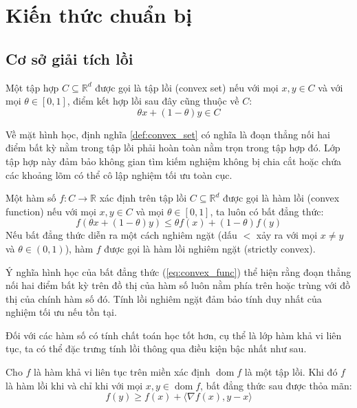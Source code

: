 \chapter{Kiến thức chuẩn bị}

\section{Cơ sở giải tích lồi}

\begin{definition}
\label{def:convex_set}
Một tập hợp $C \subseteq \mathbb{R}^d$ được gọi là tập lồi (convex set) nếu với mọi $x, y \in C$ và với mọi $\theta \in [0, 1]$, điểm kết hợp lồi sau đây cũng thuộc về $C$:
\begin{equation}
\theta x + (1 - \theta)y \in C
\end{equation}
\end{definition}

Về mặt hình học, định nghĩa \ref{def:convex_set} có nghĩa là đoạn thẳng nối hai điểm bất kỳ nằm trong tập lồi phải hoàn toàn nằm trọn trong tập hợp đó. Lớp tập hợp này đảm bảo không gian tìm kiếm nghiệm không bị chia cắt hoặc chứa các khoảng lõm có thể cô lập nghiệm tối ưu toàn cục.

\begin{definition}
\label{def:convex_function}
Một hàm số $f: C \to \mathbb{R}$ xác định trên tập lồi $C \subseteq \mathbb{R}^d$ được gọi là hàm lồi (convex function) nếu với mọi $x, y \in C$ và mọi $\theta \in [0, 1]$, ta luôn có bất đẳng thức:
\begin{equation}\label{eq:convex_func}
f(\theta x + (1 - \theta)y) \le \theta f(x) + (1 - \theta)f(y)
\end{equation}
Nếu bất đẳng thức diễn ra một cách nghiêm ngặt (dấu $<$ xảy ra với mọi $x \neq y$ và $\theta \in (0, 1)$), hàm $f$ được gọi là hàm lồi nghiêm ngặt (strictly convex).
\end{definition}

Ý nghĩa hình học của bất đẳng thức (\ref{eq:convex_func}) thể hiện rằng đoạn thẳng nối hai điểm bất kỳ trên đồ thị của hàm số luôn nằm phía trên hoặc trùng với đồ thị của chính hàm số đó. Tính lồi nghiêm ngặt đảm bảo tính duy nhất của nghiệm tối ưu nếu tồn tại.

Đối với các hàm số có tính chất toán học tốt hơn, cụ thể là lớp hàm khả vi liên tục, ta có thể đặc trưng tính lồi thông qua điều kiện bậc nhất như sau.

\begin{proposition}
\label{prop:first_order_convex}
Cho $f$ là hàm khả vi liên tục trên miền xác định $\operatorname{dom} f$ là một tập lồi. Khi đó $f$ là hàm lồi khi và chỉ khi với mọi $x, y \in \operatorname{dom} f$, bất đẳng thức sau được thỏa mãn:
\begin{equation}\label{eq:first_order_convex}
f(y) \ge f(x) + \langle \nabla f(x), y - x \rangle
\end{equation}
\end{proposition}

